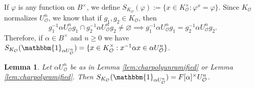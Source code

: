 \documentclass{article}
\newtheorem{lem}{Lemma}[section]
\theoremstyle{named}
\renewcommand{\O}{\mathcal{O}}
\begin{document}
If $\varphi$ is any function on $B^\times$, we define $S_{K_\O}(\varphi) := \{x \in K_\O^\times: \varphi^x = \varphi\}$. Since $K_\O$ normalizes $U_\O^n$, we know that if $g_1, g_2 \in K_\O$, then
\begin{equation}\label{eq:rigiditynormalizerprincipalneighbourhood}
    g_1^{-1} \alpha U_\O^n g_1 \cap g_2^{-1}\alpha U_\O^n  g_2 \neq \varnothing \implies g_1^{-1}\alpha U_\O^n g_1 = g_2^{-1}\alpha U_\O^n g_2.
\end{equation}
Therefore, if $\alpha \in B^\times$ and $n \geq 0$ we have $S_{K_\O}(\mathbbm{1}_{\alpha U_\O^n}) = \{x \in K_\O^\times : x^{-1}\alpha x \in \alpha U_\O^n\}$. 
\begin{lem}\label{lem:centralizer}
Let $\alpha U_\O^n$ be as in Lemma \ref{lem:charpolyunramified} or Lemma \ref{lem:charpolyramified}. Then $S_{K_\O}(\mathbbm{1}_{\alpha U_\O^n}) = F[\alpha]^\times U_\O^n$. 
\end{lem}
\end{document}

